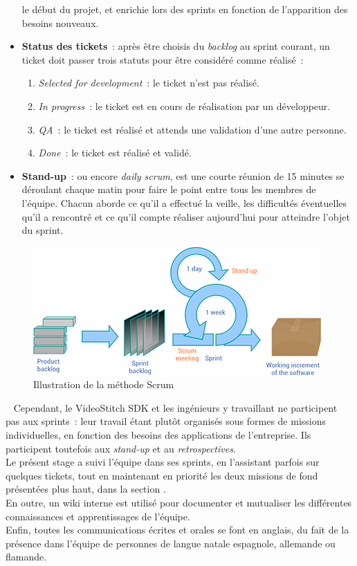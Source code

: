 \begin{itemize}
  le début du projet, et enrichie lors des sprints en fonction de l'apparition des besoins nouveaux.
  \item \textbf{Status des tickets}~: après être choisis du \textit{backlog} au sprint courant, 
  un ticket doit passer trois statuts pour être considéré comme réalisé~:
    \begin{enumerate}
      \item \textit{Selected for development}~: le ticket n'est pas réalisé.
      \item \textit{In progress}~: le ticket est en cours de réalisation par un développeur.
      \item \textit{QA}~: le ticket est réalisé et attends une validation d'une autre personne.
      \item \textit{Done}~: le ticket est réalisé et validé. 
    \end{enumerate}
  \item \textbf{Stand-up}~: \label{stand-up} ou encore \textit{daily scrum}, est une courte réunion de 15 minutes
  se déroulant chaque matin pour faire le point entre tous les membres de l'équipe.
  Chacun aborde ce qu'il a effectué la veille, les difficultés éventuelles qu'il
  a rencontré et ce qu'il compte réaliser aujourd'hui pour atteindre l'objet du sprint.
\end{itemize}
\begin{figure}
  \centering
  \includegraphics[width=11cm]{images/scrum-process.png}
  \caption{Illustration de la méthode Scrum\cite{scrum-process}}
\end{figure}
\ \newline
Cependant, le VideoStitch SDK et les ingénieurs y travaillant ne participent pas
aux sprints~: leur travail étant plutôt organisés sous formes de missions individuelles,
en fonction des besoins des applications de l'entreprise. Ils participent toutefois 
aux \textit{stand-up} et au \textit{retrospectives}.\\
Le présent stage a suivi l'équipe dans ses sprints, en l'assistant parfois sur quelques
tickets, tout en maintenant en priorité les deux missions de fond présentées plus haut, dans 
la section .\\
\newline
En outre, un wiki interne est utilisé pour documenter et mutualiser les différentes
connaissances et apprentissages de l'équipe.\\
Enfin, toutes les communications écrites et orales se font en anglais, du fait
de la présence dans l'équipe de personnes de langue natale espagnole, allemande ou flamande.

